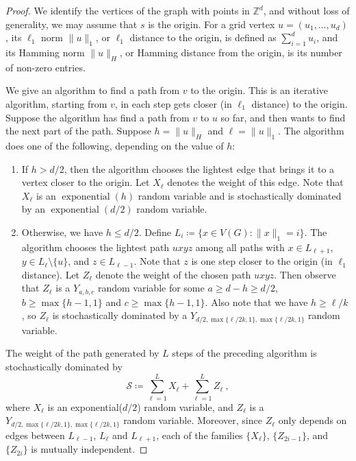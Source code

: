 \documentclass{patmorin}
\DeclareMathOperator{\exponential}{exponential}
\begin{document}
\begin{proof}
We identify the vertices of the graph with points in $\mathbb{Z}^d$, and without loss of generality, we may assume that $s$ is the origin.
For a grid vertex $u=(u_1,\ldots,u_d)$,
its $\ell_1$ norm $\|u\|_1$, or $\ell_1$ distance to the origin, is defined as $\sum_{i=1}^d u_i$,
and its Hamming norm $\|u\|_H$, or Hamming distance from the origin, is its number of non-zero entries.

We give an algorithm to find a path from $v$ to the origin.
This is an iterative algorithm, starting from $v$,
in each step gets closer (in $\ell_1$ distance) to the origin.
Suppose the algorithm has find a path from $v$ to $u$ so far, and then wants to find the next part of the path.
Suppose $h=\|u\|_H$ and $\ell = \|u\|_{1}$.
The algorithm does one of the following, depending on the value of $h$:
\begin{enumerate}
  \item If $h > d/2$, then the algorithm chooses the lightest 
    edge that brings it to a vertex closer to the origin. 
    Let $X_{\ell}$ denotes the weight of this edge. Note that $X_{\ell}$ is an $\exponential(h)$ random variable and is stochastically dominated by an $\exponential(d/2)$ random variable.

  \item Otherwise, we have $h\leq d/2$.
  Define $L_i \coloneqq \{x\in V(G): \|x\|_1=i\}$.
    The algorithm chooses the lightest path $uxyz$ among
    all paths with $x\in L_{\ell+1}$,  $y\in L_{\ell}\setminus\{u\}$,
    and $z\in L_{\ell-1}$.
    Note that $z$ is one step closer to the origin (in $\ell_1$ distance).
    Let $Z_{\ell}$ denote the weight of the chosen path $uxyz$.
    Then observe that $Z_{\ell}$ is a $Y_{a,b,c}$ random variable for some $a\geq d-h\geq d/2$, $b\geq \max\{h-1,1\}$ and $c\geq \max\{h-1,1\}$.
    Also note that we have $h \geq \ell/k$,
    so $Z_{\ell}$ is stochastically dominated by
    a $Y_{d/2,\max\{\ell/2k,1\},\max\{\ell/2k,1\}}$ random variable.
 \end{enumerate}
The weight of the path generated by $L$ steps of the preceding algorithm 
is stochastically dominated by
\[
\mathcal S \coloneqq 
\sum_{\ell=1}^{L} X_{\ell} +
\sum_{\ell=1}^{L} Z_{\ell} \:,
\]
where $X_{\ell}$ is an exponential($d/2$) random variable,
and $Z_{\ell}$ is a $Y_{d/2,\max\{\ell/2k,1\},\max\{\ell/2k,1\}}$
random variable.
Moreover, since $Z_{\ell}$ only depends on edges 
between $L_{\ell-1}$, $L_{\ell}$ and $L_{\ell+1}$,
each of the families
$\{X_{\ell}\}$,
$\{Z_{2i-1}\}$,
and 
$\{Z_{2i}\}$
is mutually independent.


\end{proof}
\end{document}
